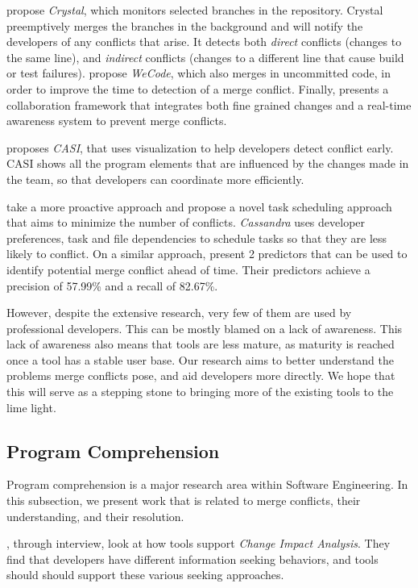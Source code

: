 \citet{Brun2011} propose \emph{Crystal}, which monitors selected branches in the repository. 
Crystal preemptively merges the branches in the background and will notify the developers of any conflicts that arise. 
It detects both \emph{direct} conflicts (changes to the same line), and \emph{indirect} conflicts (changes to a different line that cause build or test failures).
\citet{Guimaraes} propose \emph{WeCode}, which also merges in uncommitted code, in order to improve the time to detection of a merge conflict.
Finally, \citet{estler_unifying_2013} presents a collaboration framework that integrates both fine grained changes and a real-time awareness system to prevent merge conflicts.

\citet{servant_casi:_2010} proposes \emph{CASI}, that uses visualization to help developers detect conflict early.
CASI shows all the program elements that are influenced by the changes made in the team, so that developers can coordinate more efficiently.

\citet{cassandra} take a more proactive approach and propose a novel task scheduling approach that aims to minimize the number of conflicts. 
\emph{Cassandra} uses developer preferences, task and file dependencies to schedule tasks so that they are less likely to conflict.
On a similar approach, \citet{accioly_analyzing_2018} present 2 predictors that can be used to identify potential merge conflict ahead of time.
Their predictors achieve a precision of 57.99\% and a recall of 82.67\%.

However, despite the extensive research, very few of them are used by professional developers.
This can be mostly blamed on a lack of awareness.
This lack of awareness also means that tools are less mature, as maturity is reached once a tool has a stable user base.
Our research aims to better understand the problems merge conflicts pose, and aid developers more directly.
We hope that this will serve as a stepping stone to bringing more of the existing tools to the lime light.

\subsection{Program Comprehension}\label{sec:rw:pc}

Program comprehension is a major research area within Software Engineering.
In this subsection, we present work that is related to merge conflicts, their understanding, and their resolution.

\citet{borg2017software}, through interview, look at how tools support \emph{Change Impact Analysis}. 
They find that developers have different information seeking behaviors, and tools should should support these various seeking approaches.

